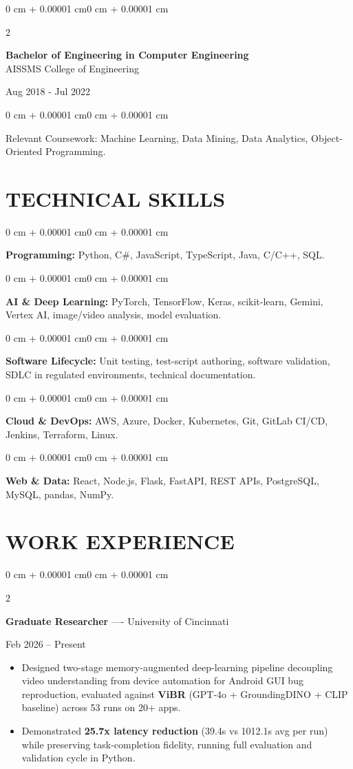 \documentclass[10pt, letterpaper]{article}
\newenvironment{highlights}{
    \begin{itemize}[
        topsep=0.10 cm,
        parsep=0.06 cm,
        partopsep=0pt,
        itemsep=0.06 cm,
        leftmargin=12pt
    ]
}{
    \end{itemize}
}
\newenvironment{onecolentry}{
    \begin{adjustwidth}{0 cm + 0.00001 cm}{0 cm + 0.00001 cm}
}{
    \end{adjustwidth}
}
\newenvironment{twocolentry}[2][]{
    \onecolentry
    \def\secondColumn{#2}
    \setcolumnwidth{\fill, 4.5 cm}
    \begin{paracol}{2}
}{
    \switchcolumn \raggedleft \secondColumn
    \end{paracol}
    \endonecolentry
}
\begin{document}
\begin{twocolentry}{
    Aug 2018 - Jul 2022
}
    \textbf{Bachelor of Engineering in Computer Engineering} \\
    AISSMS College of Engineering
\end{twocolentry}
\begin{onecolentry}
Relevant Coursework: Machine Learning, Data Mining, Data Analytics, Object-Oriented Programming.
\end{onecolentry}
\section{TECHNICAL SKILLS}
\begin{onecolentry}
\textbf{Programming:} Python, C\#, JavaScript, TypeScript, Java, C/C++, SQL.
\end{onecolentry}
\vspace{0.06 cm}
\begin{onecolentry}
\textbf{AI \& Deep Learning:} PyTorch, TensorFlow, Keras, scikit-learn, Gemini, Vertex AI, image/video analysis, model evaluation.
\end{onecolentry}
\vspace{0.06 cm}
\begin{onecolentry}
\textbf{Software Lifecycle:} Unit testing, test-script authoring, software validation, SDLC in regulated environments, technical documentation.
\end{onecolentry}
\vspace{0.06 cm}
\begin{onecolentry}
\textbf{Cloud \& DevOps:} AWS, Azure, Docker, Kubernetes, Git, GitLab CI/CD, Jenkins, Terraform, Linux.
\end{onecolentry}
\vspace{0.06 cm}
\begin{onecolentry}
\textbf{Web \& Data:} React, Node.js, Flask, FastAPI, REST APIs, PostgreSQL, MySQL, pandas, NumPy.
\end{onecolentry}

\section{WORK EXPERIENCE}
\begin{twocolentry}{Feb 2026 -- Present}
\textbf{Graduate Researcher} ---- University of Cincinnati
\end{twocolentry}
\begin{highlights}
  \item Designed two-stage memory-augmented deep-learning pipeline decoupling video understanding from device automation for Android GUI bug reproduction, evaluated against \textbf{ViBR} (GPT-4o + GroundingDINO + CLIP baseline) across 53 runs on 20+ apps.
  \item Demonstrated \textbf{25.7x latency reduction} (39.4s vs 1012.1s avg per run) while preserving task-completion fidelity, running full evaluation and validation cycle in Python.
\end{highlights}
\end{document}
